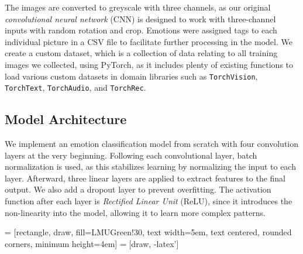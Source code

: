 
The images are converted to greyscale with three channels, 
as our original \textit{convolutional neural network} (CNN) is designed to work with three-channel inputs with random rotation and crop. 
Emotions were assigned tags to each individual picture in a CSV file to facilitate further processing in the model.
We create a custom dataset, which is a collection of data relating to all training images we collected, 
using PyTorch, 
as it includes plenty of existing functions to load various custom datasets in domain libraries such as \texttt{TorchVision}, \texttt{TorchText}, \texttt{TorchAudio}, and \texttt{TorchRec}.

\subsection{Model Architecture}
We implement an emotion classification model from scratch with four convolution layers at the very beginning. 
Following each convolutional layer, 
batch normalization is used, 
as this stabilizes learning by normalizing the input to each layer. 
Afterward, three linear layers are applied to extract features to the final output. 
We also add a dropout layer to prevent overfitting. 
The activation function after each layer is \textit{Rectified Linear Unit} (ReLU), 
since it introduces the non-linearity into the model, 
allowing it to learn more complex patterns. 

 = [rectangle, draw, fill=LMUGreen!30, text width=5em, text centered, rounded corners, minimum height=4em]
 = [draw, -latex']

